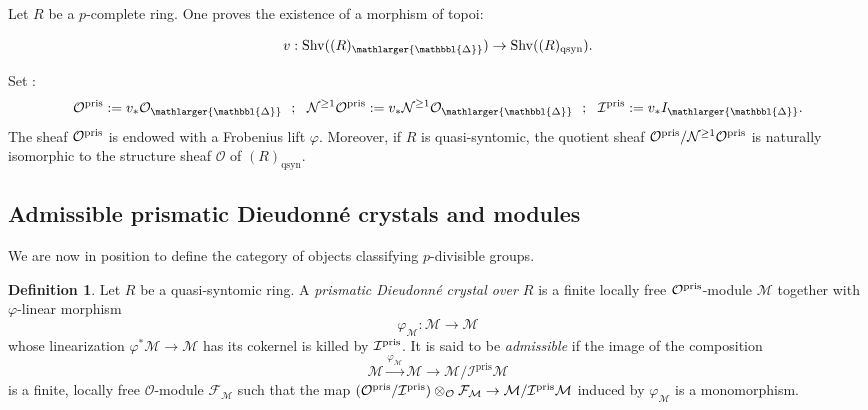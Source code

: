 \documentclass{amsart}
\newcommand{\prism}{{\mathlarger{\mathbbl{\Delta}}}}
\theoremstyle{plain}
\theoremstyle{definition}
\newtheorem{definition}[theorem]{Definition}
\newcommand{\pris}{\mathrm{pris}}
\newcommand{\red}[1]{{\color{black} #1}}
\newcommand{\blue}[1]{{\color{black}#1}}
\begin{document}
Let $R$ be a $p$-complete ring. One proves the existence of a morphism of topoi:

\[ v : \mathrm{Shv}((R)_{\prism}) \to \mathrm{Shv}((R)_{\rm qsyn}). \]

Set :
\[ \mathcal{O}^{\rm pris} := v_* \mathcal{O}_{\prism} ~~ ; ~~ \mathcal{N}^{\geq 1} \mathcal{O}^{\rm pris} := v_* \mathcal{N}^{\geq 1} \mathcal{O}_{\prism} ~~ ; ~~  \mathcal{I}^{\rm pris} := v_* I_{\prism} . \]
The sheaf $\mathcal{O}^{\rm pris}$ is endowed with a Frobenius lift $\varphi$. Moreover, if $R$ is quasi-syntomic, the quotient sheaf $\mathcal{O}^{\rm pris} / \mathcal{N}^{\geq 1} \mathcal{O}^{\rm pris}$ is naturally isomorphic to the structure sheaf $\mathcal{O}$ of $(R)_{\mathrm{qsyn}}$. 



\subsection{\red{Admissible} prismatic Dieudonn\'e crystals and modules}
We are now in position to define the category of objects classifying $p$-divisible groups.

\begin{definition}
Let $R$ be a quasi-syntomic ring. A \textit{prismatic Dieudonn\'e crystal over $R$} is a finite locally free $\mathcal{O}^{\rm pris}$-module $\mathcal{M}$ together with $\varphi$-linear morphism
  $$
  \varphi_{\mathcal{M}} \colon  \mathcal{M}\to \mathcal{M}
  $$
  whose linearization $\varphi^\ast \mathcal{M}\to \mathcal{M}$ has its cokernel is killed by $\mathcal{I}^{\rm pris}$. It is said to be \textit{admissible} if the image of the composition
    \[
      \mathcal{M}\xrightarrow{\varphi_{\mathcal{M}}} \mathcal{M}\to \mathcal{M}/\mathcal{I}^\pris \mathcal{M}
    \]
  \blue{ is a finite, locally free $\mathcal{O}$-module $\mathcal{F}_{\mathcal{M}}$ such that the map $(\mathcal{O}^{\rm pris}/\mathcal{I}^{\rm pris}) \otimes_{\mathcal{O}} \mathcal{F}_{\mathcal{M}} \to \mathcal{M}/\mathcal{I}^{\rm pris}\mathcal{M}$ induced by $\varphi_{\mathcal{M}}$ is a monomorphism. }
\end{definition}
\end{document}
